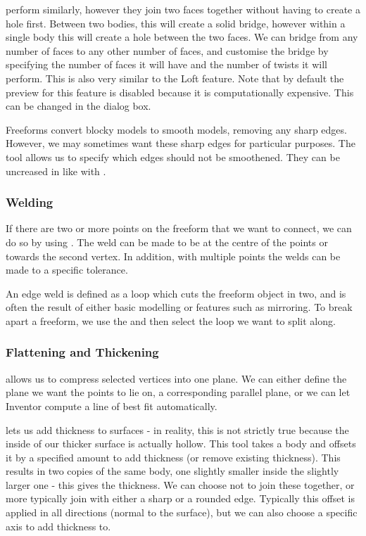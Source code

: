  perform similarly, however they join two faces together without having to create a hole first. Between two bodies, this will create a solid bridge, however within a single body this will create a hole between the two faces. We can bridge from any number of faces to any other number of faces, and customise the bridge by specifying the number of faces it will have and the number of twists it will perform. This is also very similar to the Loft feature. Note that by default the preview for this feature is disabled because it is computationally expensive. This can be changed in the dialog box.

Freeforms convert blocky models to smooth models, removing any sharp edges. However, we may sometimes want these sharp edges for particular purposes. The  tool allows us to specify which edges should not be smoothened. They can be uncreased in like with .

\subsubsection{Welding}
\easydifficulty

If there are two or more points on the freeform that we want to connect, we can do so by using . The weld can be made to be at the centre of the points or towards the second vertex. In addition, with multiple points the welds can be made to a specific tolerance. 

An edge weld is defined as a loop which cuts the freeform object in two, and is often the result of either basic modelling or features such as mirroring. To break apart a freeform, we use the  and then select the loop we want to split along. 


\subsubsection{Flattening and Thickening}

 allows us to compress selected vertices into one plane. We can either define the plane we want the points to lie on, a corresponding parallel plane, or we can let Inventor compute a line of best fit automatically.

 lets us add thickness to surfaces - in reality, this is not strictly true because the inside of our thicker surface is actually hollow. This tool takes a body and offsets it by a specified amount to add thickness (or remove existing thickness). This results in two copies of the same body, one slightly smaller inside the slightly larger one - this gives the thickness. We can choose not to join these together, or more typically join with either a sharp or a rounded edge. Typically this offset is applied in all directions (normal to the surface), but we can also choose a specific axis to add thickness to.

